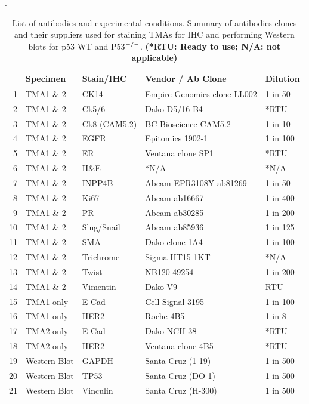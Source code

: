\begin{table}
\centering
\caption{List of antibodies and experimental conditions.
Summary of antibodies clones and their suppliers used for staining TMAs for IHC and performing Western blots for p53 WT and P53$^{\small{-/-}}$.
\small\textbf{(*RTU: Ready to use; N/A: not applicable)}}.
\label{stab:antibodieslist}
\begin{tabular}{rllll}
  \hline
 & Specimen & Stain/IHC & Vendor / Ab Clone & Dilution  \\ 
  \hline
1 & TMA1 \& 2 & CK14 & Empire Genomics clone LL002 & 1 in 50 \\ 
  2 & TMA1 \& 2 & Ck5/6 & Dako D5/16 B4 & *RTU  \\ 
  3 & TMA1 \& 2 & Ck8 (CAM5.2) & BC Bioscience CAM5.2 & 1 in 10  \\ 
  4 & TMA1 \& 2 & EGFR & Epitomics 1902-1 & 1 in 100  \\ 
  5 & TMA1 \& 2 & ER & Ventana  clone SP1 & *RTU\\ 
  6 & TMA1 \& 2 & H\&E & *N/A & *N/A \\ 
  7 & TMA1 \& 2 & INPP4B & Abcam EPR3108Y ab81269 & 1 in 50 \\ 
  8 & TMA1 \& 2 & Ki67 & Abcam ab16667  & 1 in 400  \\ 
  9 & TMA1 \& 2 & PR & Abcam ab30285 & 1 in 200  \\ 
  10 & TMA1 \& 2 & Slug/Snail & Abcam ab85936 & 1 in 125 \\ 
  11 & TMA1 \& 2 & SMA & Dako clone 1A4 & 1 in 100 \\ 
  12 & TMA1 \& 2 & Trichrome & Sigma-HT15-1KT & *N/A \\ 
  13 & TMA1 \& 2 & Twist & NB120-49254 & 1 in 200\\ 
  14 & TMA1 \& 2 & Vimentin & Dako V9 & RTU  \\ 
  15 & TMA1 only & E-Cad & Cell Signal 3195 & 1 in 100  \\ 
  16 & TMA1 only & HER2 & Roche 4B5 & 1 in 8  \\ 
  17 & TMA2 only & E-Cad & Dako NCH-38 & *RTU  \\ 
  18 & TMA2 only & HER2 & Ventana  clone 4B5 & *RTU \\ 
  19 & Western Blot & GAPDH  & Santa Cruz (1-19) & 1 in 500  \\ 
  20 & Western Blot & TP53 & Santa Cruz (DO-1) & 1 in 500  \\ 
  21 & Western Blot & Vinculin & Santa Cruz (H-300) & 1 in 500  \\ 
   \hline
\end{tabular}
\end{table}











